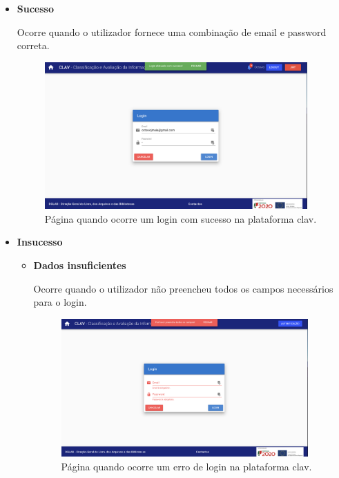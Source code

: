 \begin{itemize}
    \vspace{-2mm}
    \item \textbf{Sucesso}
    
    Ocorre quando o utilizador fornece uma combinação de email e password correta.
    
    \begin{figure}[h!]
        \centering
        \includegraphics[width=0.95\textwidth]{img/clav/authlocal/sucessoLogin.png}
        \caption{Página quando ocorre um login com sucesso na plataforma \gls{clav}.}
        \label{fig:registoLogin}
    \end{figure}
    
    \item \textbf{Insucesso}
    
    \begin{itemize}
        \item \textbf{Dados insuficientes}
        
        Ocorre quando o utilizador não preencheu todos os campos necessários para o login.
        
        \begin{figure}[h!]
            \centering
            \includegraphics[width=0.95\textwidth]{img/clav/authlocal/erroLogin1.png}
            \caption{Página quando ocorre um erro de login na plataforma \gls{clav}.}
            \label{fig:loginErro1}
        \end{figure}
        

\end{itemize}
\end{itemize}
